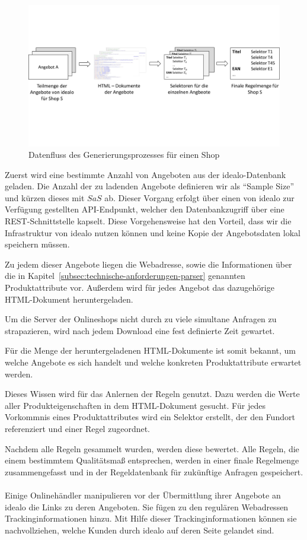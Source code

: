 \begin{figure}[H]
    \centering
    \includegraphics[width=\textwidth, trim=0 6cm 0 5cm, clip]{resources/Datenfluss-SRG.pdf}
    \caption{Datenfluss des Generierungsprozesses für einen Shop}
    \label{abb:datenfluss-srg}
\end{figure}

Zuerst wird eine bestimmte Anzahl von Angeboten aus der idealo-Datenbank geladen.
Die Anzahl der zu ladenden Angebote definieren wir als ``Sample Size'' und kürzen dieses mit $SaS$ ab.
Dieser Vorgang erfolgt über einen von idealo zur Verfügung gestellten API-Endpunkt, welcher den Datenbankzugriff über
eine REST-Schnittstelle kapselt.
Diese Vorgehensweise hat den Vorteil, dass wir die Infrastruktur von idealo nutzen können und keine Kopie der
Angebotsdaten lokal speichern müssen.

Zu jedem dieser Angebote liegen die Webadresse, sowie die Informationen über die in
Kapitel~\ref{subsec:technische-anforderungen-parser} genannten Produktattribute vor.
Außerdem wird für jedes Angebot das dazugehörige HTML-Dokument heruntergeladen.

Um die Server der Onlineshops nicht durch zu viele simultane Anfragen zu strapazieren, wird nach jedem
Download eine fest definierte Zeit gewartet.

Für die Menge der heruntergeladenen HTML-Dokumente ist somit bekannt, um welche Angebote es sich handelt und welche
konkreten Produktattribute erwartet werden.

Dieses Wissen wird für das Anlernen der Regeln genutzt.
Dazu werden die Werte aller Produkteigenschaften in dem HTML-Dokument gesucht.
Für jedes Vorkommnis eines Produktattributes wird ein Selektor erstellt, der den Fundort referenziert und einer Regel
zugeordnet.

Nachdem alle Regeln gesammelt wurden, werden diese bewertet.
Alle Regeln, die einem bestimmtem Qualitätsmaß entsprechen, werden in einer finale Regelmenge zusammengefasst und in
der Regeldatenbank für zukünftige Anfragen gespeichert.
\\
~\\
Einige Onlinehändler manipulieren vor der Übermittlung ihrer Angebote an idealo die Links zu deren Angeboten.
Sie fügen zu den regulären Webadressen Trackinginformationen hinzu.
Mit Hilfe dieser Trackinginformationen können sie nachvollziehen, welche Kunden durch idealo auf deren Seite gelandet
sind.

